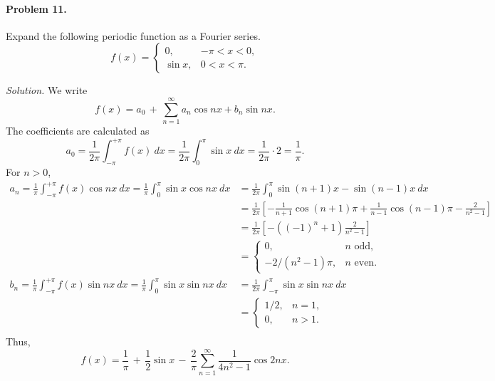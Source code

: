 \documentclass[10pt]{article}
\begin{document}
        \paragraph{Problem 11.} Expand the following periodic function as a Fourier series.
        \[
                f(x) = \begin{cases}
                        0, & -\pi < x < 0,      \\
                        \sin{x}, & 0 < x < \pi.
                \end{cases}
        \]
        
        \textit{Solution.} We write
        \[
                f(x) = a_0 \,+\, \sum_{n = 1}^\infty a_n\cos{nx} + b_n\sin{nx}.
        \]
        The coefficients are calculated as
        \[
                a_0 = \frac{1}{2\pi}\int_{-\pi}^{+\pi} f(x)\:dx = \frac{1}{2\pi}\int_0^\pi \sin{x}\:dx = \frac{1}{2\pi}\cdot 2 = \frac{1}{\pi}.
        \]
        For $n > 0$,
        \begin{align*}
                a_n = \frac{1}{\pi}\int_{-\pi}^{+\pi} f(x)\cos{nx}\:dx 
                        = \frac{1}{\pi}\int_0^\pi \sin{x}\cos{nx}\:dx 
                        &= \frac{1}{2\pi}\int_0^\pi \sin{(n + 1)x} - \sin{(n - 1)x}\:dx \\
                        &= \frac{1}{2\pi}\left[-\frac{1}{n+1}\cos{(n+1)\pi} + \frac{1}{n-1}\cos{(n-1)\pi} - \frac{2}{n^2 - 1}\right] \\
                        &= \frac{1}{2\pi}\left[-((-1)^n + 1)\frac{2}{n^2 - 1}\right] \\
                        &= \begin{cases}
                                0, & n \text{ odd}, \\
                                -2 /(n^2 - 1)\pi, & n \text{ even}.
                        \end{cases} \\
                b_n = \frac{1}{\pi}\int_{-\pi}^{+\pi} f(x)\sin{nx}\:dx 
                        = \frac{1}{\pi}\int_0^\pi \sin{x}\sin{nx}\:dx 
                        &= \frac{1}{2\pi}\int_{-\pi}^\pi \sin{x}\sin{nx}\:dx  \\
                        &= \begin{cases}
                                1 /2, & n = 1, \\
                                0, & n > 1.
                        \end{cases} \\
        \end{align*}
        Thus,
        \[
                f(x) = \frac{1}{\pi} \,+\, \frac{1}{2}\sin{x} \,-\, \frac{2}{\pi}\sum_{n = 1}^\infty \frac{1}{4n^2 - 1}\cos{2nx}.
        \]
\end{document}
